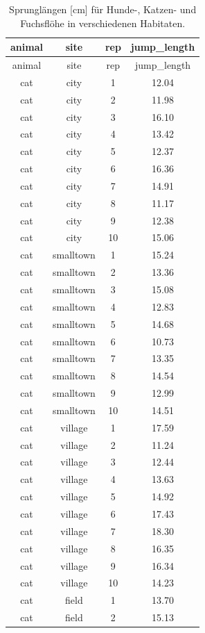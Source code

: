 \documentclass[
  letterpaper,
]{scrbook}
\begin{document}
\begin{longtable}[]{@{}cccc@{}}
\caption{\label{tbl-example-4}Sprunglängen {[}cm{]} für Hunde-, Katzen-
und Fuchsflöhe in verschiedenen Habitaten.}\tabularnewline
\toprule()
animal & site & rep & jump\_length \\
\midrule()
\endfirsthead
\toprule()
animal & site & rep & jump\_length \\
\midrule()
\endhead
cat & city & 1 & 12.04 \\
cat & city & 2 & 11.98 \\
cat & city & 3 & 16.10 \\
cat & city & 4 & 13.42 \\
cat & city & 5 & 12.37 \\
cat & city & 6 & 16.36 \\
cat & city & 7 & 14.91 \\
cat & city & 8 & 11.17 \\
cat & city & 9 & 12.38 \\
cat & city & 10 & 15.06 \\
cat & smalltown & 1 & 15.24 \\
cat & smalltown & 2 & 13.36 \\
cat & smalltown & 3 & 15.08 \\
cat & smalltown & 4 & 12.83 \\
cat & smalltown & 5 & 14.68 \\
cat & smalltown & 6 & 10.73 \\
cat & smalltown & 7 & 13.35 \\
cat & smalltown & 8 & 14.54 \\
cat & smalltown & 9 & 12.99 \\
cat & smalltown & 10 & 14.51 \\
cat & village & 1 & 17.59 \\
cat & village & 2 & 11.24 \\
cat & village & 3 & 12.44 \\
cat & village & 4 & 13.63 \\
cat & village & 5 & 14.92 \\
cat & village & 6 & 17.43 \\
cat & village & 7 & 18.30 \\
cat & village & 8 & 16.35 \\
cat & village & 9 & 16.34 \\
cat & village & 10 & 14.23 \\
cat & field & 1 & 13.70 \\
cat & field & 2 & 15.13 \\

\end{longtable}
\end{document}
